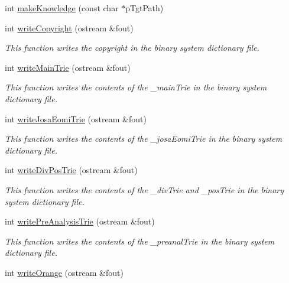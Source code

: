 \begin{CompactItemize}
int \hyperlink{classkmaOrange_1_1Dictionary_50781e76950dced011623aaeb4d81500}{makeKnowledge} (const char $\ast$pTgtPath)
\item 
int \hyperlink{classkmaOrange_1_1Dictionary_48925ba3955d2efa603e1ec42ebc98fb}{writeCopyright} (ostream \&fout)
\begin{CompactList}\small\item\em This function writes the copyright in the binary system dictionary file. \item\end{CompactList}\item 
int \hyperlink{classkmaOrange_1_1Dictionary_220a21911afc35f3b4801afc1d589e94}{writeMainTrie} (ostream \&fout)
\begin{CompactList}\small\item\em This function writes the contents of the \_\-mainTrie in the binary system dictionary file. \item\end{CompactList}\item 
int \hyperlink{classkmaOrange_1_1Dictionary_c7ea4f013545ce948c25a0fbbd221ca8}{writeJosaEomiTrie} (ostream \&fout)
\begin{CompactList}\small\item\em This function writes the contents of the \_\-josaEomiTrie in the binary system dictionary file. \item\end{CompactList}\item 
int \hyperlink{classkmaOrange_1_1Dictionary_8a9ffe32003af4423dbe33f9e29d8627}{writeDivPosTrie} (ostream \&fout)
\begin{CompactList}\small\item\em This function writes the contents of the \_\-divTrie and \_\-posTrie in the binary system dictionary file. \item\end{CompactList}\item 
int \hyperlink{classkmaOrange_1_1Dictionary_0a8a9746a6199a64ed7b7b340d982aeb}{writePreAnalysisTrie} (ostream \&fout)
\begin{CompactList}\small\item\em This function writes the contents of the \_\-preanalTrie in the binary system dictionary file. \item\end{CompactList}\item 
int \hyperlink{classkmaOrange_1_1Dictionary_a3b6002c7fb1df61d07f3e10842b269f}{writeOrange} (ostream \&fout)

\end{CompactItemize}
